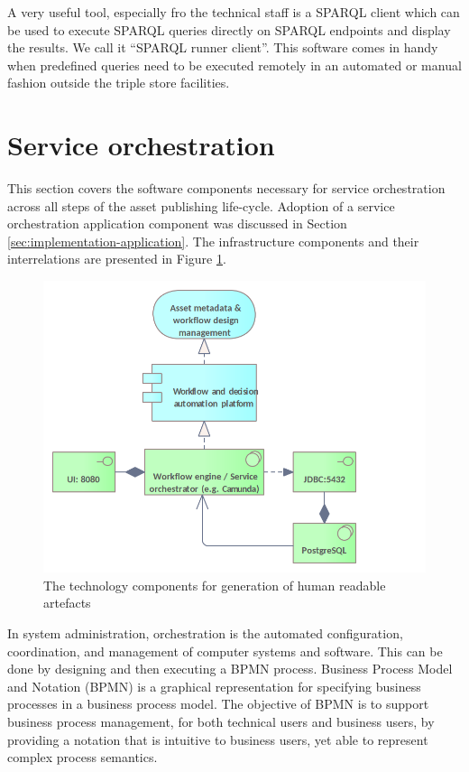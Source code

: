 	A very useful tool, especially fro the technical staff is a SPARQL client which can be used to execute SPARQL queries directly on SPARQL endpoints and display the results. We call it ``SPARQL runner client''. This software comes in handy when predefined queries need to be executed remotely in an automated or manual fashion outside the triple store facilities.
	
	
	\section{Service orchestration}
	\label{sec:technology-view-orchestration}
	
	This section covers the software components necessary for service orchestration across all steps of the asset publishing life-cycle. Adoption of a service orchestration application component was discussed in Section \ref{sec:implementation-application}. The infrastructure components and their interrelations are presented in Figure \ref{fig:technology-view-orchestration}. 
	
	\begin{figure}[!h]
		\centering
		\includegraphics[width=.8\textwidth]{images/infra-setup/orchestration.png}
		\caption{The technology components for generation of human readable artefacts}
		\label{fig:technology-view-orchestration}
	\end{figure}

	In system administration, orchestration is the automated configuration, coordination, and management of computer systems and software. This can be done by designing and then executing a BPMN process. Business Process Model and Notation (BPMN) is a graphical representation for specifying business processes in a business process model. The objective of BPMN is to support business process management, for both technical users and business users, by providing a notation that is intuitive to business users, yet able to represent complex process semantics.

